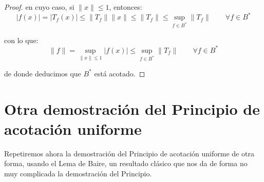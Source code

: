 \begin{coro}
\begin{proof}
        en cuyo caso, si $\|x\|\leq 1$, entonces:
        \begin{equation*}
            |f(x)| = |T_f(x)| \leq \|T_f\|\|x\|\leq \|T_f\| \leq \sup_{f\in B^\ast}\|T_f\| \qquad \forall f\in B^\ast
        \end{equation*}

        con lo que:
        \begin{equation*}
            \|f\| = \sup_{\|x\|\leq 1}|f(x)| \leq \sup_{f\in B^\ast}\|T_f\| \qquad \forall f\in B^\ast
        \end{equation*}

        de donde deducimos que $B^\ast$ está acotado.
    \end{proof}
\end{coro}

\section{Otra demostración del Principio de acotación uniforme}
\noindent
Repetiremos ahora la demostración del Principio de acotación uniforme de otra forma, usando el Lema de Baire, un resultado clásico que nos da de forma no muy complicada la demostración del Principio.

